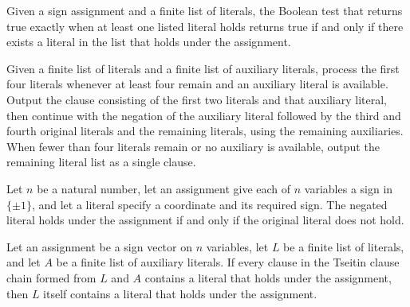 \begin{theorem}
\label{FABL.literalListHoldsDecision_eq_true}
\leanok
{}
Given a sign assignment and a finite list of literals, the Boolean test that returns
true exactly when at least one listed literal holds returns true if and only if there
exists a literal in the list that holds under the assignment.
\end{theorem}

\begin{definition}
\label{FABL.tseitinClauseChain}
\leanok
{}
Given a finite list of literals and a finite list of auxiliary literals, process the
first four literals whenever at least four remain and an auxiliary literal is available.
Output the clause consisting of the first two literals and that auxiliary literal, then
continue with the negation of the auxiliary literal followed by the third and fourth
original literals and the remaining literals, using the remaining auxiliaries. When
fewer than four literals remain or no auxiliary is available, output the remaining
literal list as a single clause.
\end{definition}

\begin{theorem}
\label{FABL.literalHolds_negate_iff_not}
\leanok
{}
Let $n$ be a natural number, let an assignment give each of $n$ variables a sign in
$\{\pm1\}$, and let a literal specify a coordinate and its required sign. The negated
literal holds under the assignment if and only if the original literal does not hold.
\end{theorem}

\begin{theorem}
\label{FABL.literalListHolds_of_tseitinClauseChain}
\leanok
{}
Let an assignment be a sign vector on $n$ variables, let $L$ be a finite list of
literals, and let $A$ be a finite list of auxiliary literals. If every clause in the
Tseitin clause chain formed from $L$ and $A$ contains a literal that holds under the
assignment, then $L$ itself contains a literal that holds under the assignment.
\end{theorem}

